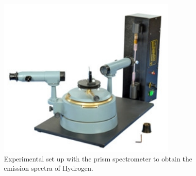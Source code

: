 \documentclass[%
 reprint,
 amsmath,amssymb,
 aps,
]{revtex4-2}
\begin{document}
    \begin{figure}
        \centering
        \includegraphics[scale = 1]{Figures/setup.png}
        \caption{Experimental set up with the prism spectrometer to obtain the emission spectra of Hydrogen.}
        \label{fig:setup}
    \end{figure}
    
\end{document}
